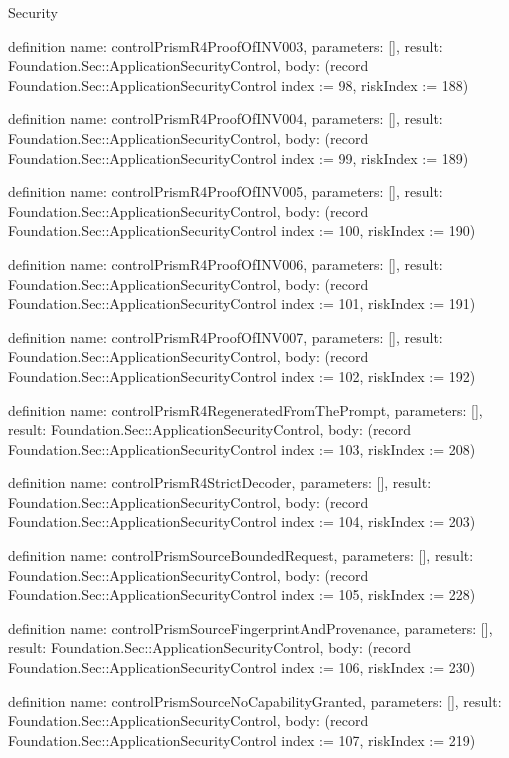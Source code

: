 \begin{lexlean}{Security}
\begin{semanticmodule}
definition{
  name: controlPrismR4ProofOfINV003,
  parameters: [],
  result: Foundation.Sec::ApplicationSecurityControl,
  body: (record Foundation.Sec::ApplicationSecurityControl {index := 98, riskIndex := 188})
}

definition{
  name: controlPrismR4ProofOfINV004,
  parameters: [],
  result: Foundation.Sec::ApplicationSecurityControl,
  body: (record Foundation.Sec::ApplicationSecurityControl {index := 99, riskIndex := 189})
}

definition{
  name: controlPrismR4ProofOfINV005,
  parameters: [],
  result: Foundation.Sec::ApplicationSecurityControl,
  body: (record Foundation.Sec::ApplicationSecurityControl {index := 100, riskIndex := 190})
}

definition{
  name: controlPrismR4ProofOfINV006,
  parameters: [],
  result: Foundation.Sec::ApplicationSecurityControl,
  body: (record Foundation.Sec::ApplicationSecurityControl {index := 101, riskIndex := 191})
}

definition{
  name: controlPrismR4ProofOfINV007,
  parameters: [],
  result: Foundation.Sec::ApplicationSecurityControl,
  body: (record Foundation.Sec::ApplicationSecurityControl {index := 102, riskIndex := 192})
}

definition{
  name: controlPrismR4RegeneratedFromThePrompt,
  parameters: [],
  result: Foundation.Sec::ApplicationSecurityControl,
  body: (record Foundation.Sec::ApplicationSecurityControl {index := 103, riskIndex := 208})
}

definition{
  name: controlPrismR4StrictDecoder,
  parameters: [],
  result: Foundation.Sec::ApplicationSecurityControl,
  body: (record Foundation.Sec::ApplicationSecurityControl {index := 104, riskIndex := 203})
}

definition{
  name: controlPrismSourceBoundedRequest,
  parameters: [],
  result: Foundation.Sec::ApplicationSecurityControl,
  body: (record Foundation.Sec::ApplicationSecurityControl {index := 105, riskIndex := 228})
}

definition{
  name: controlPrismSourceFingerprintAndProvenance,
  parameters: [],
  result: Foundation.Sec::ApplicationSecurityControl,
  body: (record Foundation.Sec::ApplicationSecurityControl {index := 106, riskIndex := 230})
}

definition{
  name: controlPrismSourceNoCapabilityGranted,
  parameters: [],
  result: Foundation.Sec::ApplicationSecurityControl,
  body: (record Foundation.Sec::ApplicationSecurityControl {index := 107, riskIndex := 219})
}


\end{semanticmodule}
\end{lexlean}
